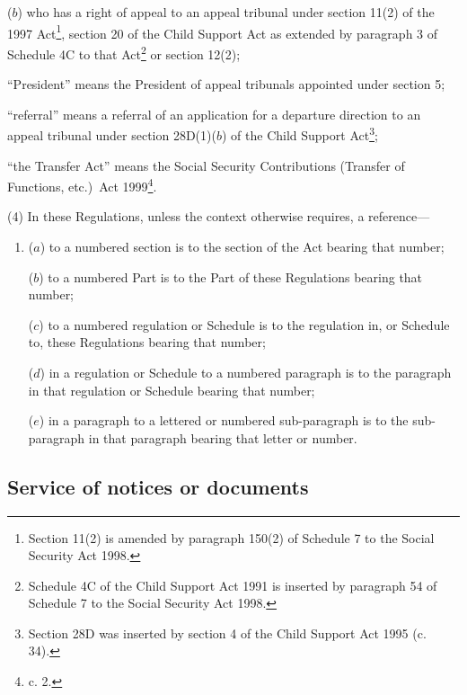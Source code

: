 \documentclass[12pt,a4paper]{article}
\begin{document}
\begin{enumerate}
\begin{enumerate}
($b$) who has a right of appeal to an appeal tribunal under section 11(2) of the 1997 Act\footnote{\frenchspacing Section 11(2) is amended by paragraph 150(2) of Schedule 7 to the Social Security Act 1998.}, section 20 of the Child Support Act as extended by paragraph 3 of Schedule 4C to that Act\footnote{\frenchspacing Schedule 4C of the Child Support Act 1991 is inserted by paragraph 54 of Schedule 7 to the Social Security Act 1998.} or section 12(2);
\end{enumerate}

“President” means the President of appeal tribunals appointed under section 5;

“referral” means a referral of an application for a departure direction to an appeal tribunal under section 28D(1)($b$) of the Child Support Act\footnote{\frenchspacing Section 28D was inserted by section 4 of the Child Support Act 1995 (c. 34).};

“the Transfer Act” means the Social Security Contributions (Transfer of Functions, etc.)\ Act 1999\footnote{ c. 2.}.
\end{enumerate}

(4) In these Regulations, unless the context otherwise requires, a reference—
\begin{enumerate}\item[]
($a$) to a numbered section is to the section of the Act bearing that number;

($b$) to a numbered Part is to the Part of these Regulations bearing that number;

($c$) to a numbered regulation or Schedule is to the regulation in, or Schedule to, these Regulations bearing that number;

($d$) in a regulation or Schedule to a numbered paragraph is to the paragraph in that regulation or Schedule bearing that number;

($e$) in a paragraph to a lettered or numbered sub-paragraph is to the sub-paragraph in that paragraph bearing that letter or number.
\end{enumerate}


\subsection[2. Service of notices or documents]{Service of notices or documents}
\end{document}
